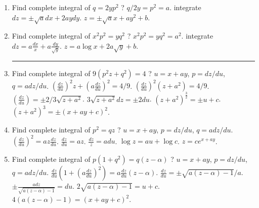 \begin{enumerate}
	\item Find complete integral of $q = 2yp^2$ ?
	$q/2y = p^2 = a$.
	integrate $dz = \pm \sqrt{a} dx + 2ay dy$.
	$z = \pm \sqrt{a}x + ay^2 + b$.
	\item Find complete integral of $x^2p^2 = yq^2$ ?
	$x^2p^2 = yq^2 = a^2$.
	integrate $dz = a \frac{dx}{x} + a \frac{dy}{\sqrt{y}}$.
	$z = a\log x + 2a\sqrt{y} + b$.\\
	\hrule
	\item Find complete integral of $9(p^2z + q^2) = 4$ ?
	$u = x+ay$, $p = dz/du$, $q = a dz/du$.
	$(\frac{dz}{du})^2 z + (a \frac{dz}{du})^2 = 4/9$.
	$(\frac{dz}{du})^2 (z + a^2) = 4/9$.
	$(\frac{dz}{du}) = \pm 2/3\sqrt{z+a^2}$.
	$3\sqrt{z+a^2}dz = \pm 2du$.
	$(z+a^2)^\frac{3}{2} = \pm u + c$.
	$(z+a^2)^3 = \pm (x+ay+c)^2$.
	\item Find complete integral of $p^2 = qz$ ?
	$u = x+ay$, $p = dz/du$, $q = a dz/du$.
	$(\frac{dz}{du})^2 = az \frac{dz}{du}$.
	$\frac{dz}{du} = az$.
	$\frac{dz}{z} = adu$.
	$\log z = au + \log c$.
	$z = ce^{x+ay}$.
	\item Find complete integral of $p(1+q^2) = q(z-\alpha)$ ?
	$u = x+ay$, $p = dz/du$, $q = a dz/du$.
	$\frac{dz}{du} (1 + (a\frac{dz}{du})^2) = a \frac{dz}{du} (z - \alpha)$.
	$\frac{dz}{du} = \pm \sqrt{a(z-\alpha)-1}/a$.
	$\pm \frac{adz}{\sqrt{a(z-\alpha)-1}} = du$.
	$2\sqrt{a(z-\alpha)-1} = u + c$.
	$4(a(z-\alpha)-1)  = (x+ay+c)^2$.
\end{enumerate}

